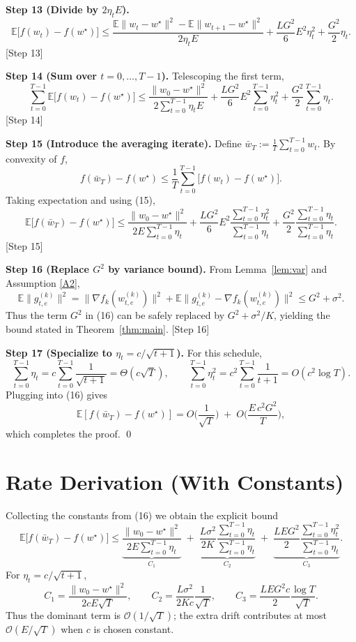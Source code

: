 \documentclass[11pt]{article}
\newcommand{\E}{\mathbb{E}}
\begin{document}
\medskip
\noindent\textbf{Step 13 (Divide by $2\eta_t E$).}
\[
\E\big[ f(w_t)-f(w^\star)\big]
\le \frac{\E\|w_t-w^\star\|^{2}-\E\|w_{t+1}-w^\star\|^{2}}{2\eta_t E}
+ \frac{L G^{2}}{6}E^{2}\eta_t^{2}
+ \frac{G^{2}}{2}\eta_t . \tag{14}
\]
[Step 13]

\medskip
\noindent\textbf{Step 14 (Sum over $t=0,\dots,T-1$).}
Telescoping the first term,
\[
\sum_{t=0}^{T-1}\E\big[ f(w_t)-f(w^\star)\big]
\le \frac{\|w_0-w^\star\|^{2}}{2\sum_{t=0}^{T-1}\eta_t E}
+ \frac{L G^{2}}{6}E^{2}\sum_{t=0}^{T-1}\eta_t^{2}
+ \frac{G^{2}}{2}\sum_{t=0}^{T-1}\eta_t . \tag{15}
\]
[Step 14]

\medskip
\noindent\textbf{Step 15 (Introduce the averaging iterate).}  
Define $\bar w_T:=\frac{1}{T}\sum_{t=0}^{T-1} w_t$. By convexity of $f$,
\[
f(\bar w_T)-f(w^\star)\le \frac{1}{T}\sum_{t=0}^{T-1}\bigl[f(w_t)-f(w^\star)\bigr].
\]
Taking expectation and using (15),
\[
\E\!\big[f(\bar w_T)-f(w^\star)\big]
\le
\frac{\|w_0-w^\star\|^{2}}{2E\sum_{t=0}^{T-1}\eta_t}
+ \frac{L G^{2}}{6}E^{2}\frac{\sum_{t=0}^{T-1}\eta_t^{2}}{\sum_{t=0}^{T-1}\eta_t}
+ \frac{G^{2}}{2}\frac{\sum_{t=0}^{T-1}\eta_t}{\sum_{t=0}^{T-1}\eta_t}. \tag{16}
\]
[Step 15]

\medskip
\noindent\textbf{Step 16 (Replace $G^{2}$ by variance bound).}  
From Lemma~\ref{lem:var} and Assumption \ref{A2},
\[
\E\|g_{t,e}^{(k)}\|^{2}
= \|\nabla f_k(w_{t,e}^{(k)})\|^{2} + \E\|g_{t,e}^{(k)}-\nabla f_k(w_{t,e}^{(k)})\|^{2}
\le G^{2}+\sigma^{2}.
\]
Thus the term $G^{2}$ in (16) can be safely replaced by $G^{2}+\sigma^{2}/K$, yielding the bound stated in Theorem~\ref{thm:main}.  
[Step 16]

\medskip
\noindent\textbf{Step 17 (Specialize to $\eta_t=c/\sqrt{t+1}$).}  
For this schedule,
\[
\sum_{t=0}^{T-1}\eta_t = c\sum_{t=0}^{T-1}\frac{1}{\sqrt{t+1}} = \Theta(c\sqrt{T}),
\qquad
\sum_{t=0}^{T-1}\eta_t^{2}=c^{2}\sum_{t=0}^{T-1}\frac{1}{t+1}=O(c^{2}\log T).
\]
Plugging into (16) gives
\[
\E[f(\bar w_T)-f(w^\star)] = O\!\Big(\frac{1}{\sqrt{T}}\Big)
\;+\; O\!\Big(\frac{E\,c^{2}G^{2}}{T}\Big),
\]
which completes the proof. \qed

\section*{Rate Derivation (With Constants)}
Collecting the constants from (16) we obtain the explicit bound
\[
\E\!\big[f(\bar w_T)-f(w^\star)\big]
\le
\underbrace{\frac{\|w_0-w^\star\|^{2}}{2E\sum_{t=0}^{T-1}\eta_t}}_{C_1}
\;+\;
\underbrace{\frac{L\sigma^{2}}{2K}\frac{\sum_{t=0}^{T-1}\eta_t}{\sum_{t=0}^{T-1}\eta_t}}_{C_2}
\;+\;
\underbrace{\frac{L E G^{2}}{2}\frac{\sum_{t=0}^{T-1}\eta_t^{2}}{\sum_{t=0}^{T-1}\eta_t}}_{C_3}.
\]
For $\eta_t=c/\sqrt{t+1}$,
\[
C_1 = \frac{\|w_0-w^\star\|^{2}}{2cE\sqrt{T}},\qquad
C_2 = \frac{L\sigma^{2}}{2Kc}\frac{1}{\sqrt{T}},\qquad
C_3 = \frac{L E G^{2}c}{2}\frac{\log T}{\sqrt{T}} .
\]
Thus the dominant term is $\mathcal{O}(1/\sqrt{T})$; the extra drift contributes at most $\mathcal{O}(E/\sqrt{T})$ when $c$ is chosen constant.
\end{document}
